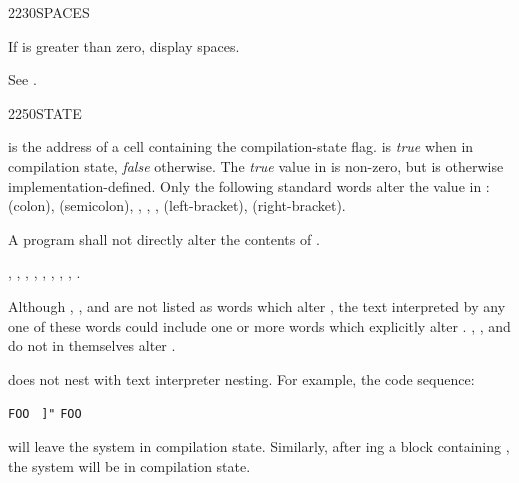 \begin{worddef}{2230}{SPACES}
\item {}

	If  is greater than zero, display  spaces.

	\begin{testing} %
		See .
	\end{testing}
\end{worddef}


\begin{worddef}{2250}{STATE}
\item {}

	 is the address of a cell containing the
	compilation-state flag.  is \emph{true} when in
	compilation state, \emph{false} otherwise. The \emph{true} value
	in  is non-zero, but is otherwise
	implementation-defined. Only the following standard words alter
	the value in :
	\word{:} (colon),
	\word{;} (semicolon),
	,
	,
	,
	\word{[} (left-bracket),
	\word{]} (right-bracket).

\note
	A program shall not directly alter the contents of .

\see {},
	,
	,
	,
	\wref{core:[}{[},
	\wref{core:]}{]},
	,
	,
	.

	\begin{rationale} %
		Although
		,
		,
		 and
		are not listed as words which alter , the text
		interpreted by any one of these words could include one or
		more words which explicitly alter .
		,
		,
		 and
		do not in themselves alter .

		 does not nest with text interpreter nesting. For
		example, the code sequence:

		\tab \word{:} \texttt{FOO}~
			 \texttt{]"} 
		\word{;}
		\qquad
		\texttt{FOO}

		will leave the system in compilation state. Similarly, after
		ing a block containing \word{]}, the system
		will be in compilation state.


\end{rationale}
\end{worddef}
